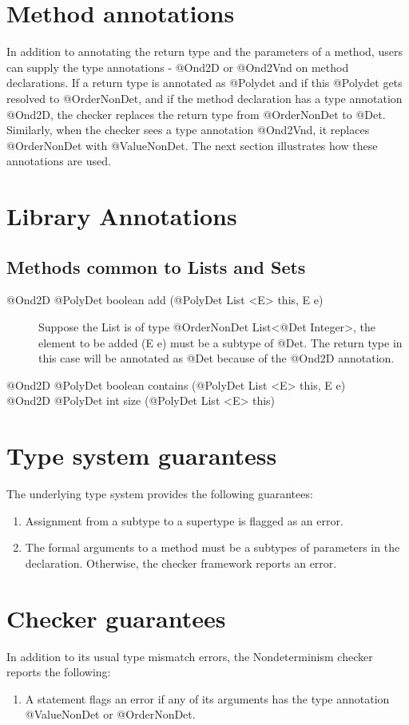 \section{Method annotations\label{nondeterminism-method-annotations}}
In addition to annotating the return type and the parameters of a method, users can supply the type annotations -
@Ond2D or @Ond2Vnd on method declarations.
If a return type is annotated as @Polydet and if this @Polydet gets resolved to @OrderNonDet, and if the method declaration has a type annotation @Ond2D,
the checker replaces the return type from @OrderNonDet to @Det. Similarly, when the checker sees a type annotation @Ond2Vnd, it
replaces @OrderNonDet with @ValueNonDet. The next section illustrates how these annotations are used.

\section{Library Annotations\label{nondeterminism-library-annotations}}
\subsection{Methods common to Lists and Sets\label{lib-methods}}
\begin{description}
  \item[@Ond2D @PolyDet  boolean add (@PolyDet List <E> this, E e)] Suppose the List is of
  type @OrderNonDet List<@Det Integer>, the element to be added (E e) must be a subtype of @Det.
  The return type in this case will be annotated as @Det because of the @Ond2D annotation.
  \item[@Ond2D @PolyDet  boolean contains (@PolyDet List <E> this, E e)]
  \item[@Ond2D @PolyDet int size (@PolyDet List <E> this)]
\end{description}

\section{Type system guarantess\label{nondeterminism-type-system-guarantees}}
The underlying type system provides the following guarantees:
\begin{enumerate}
  \item Assignment from a subtype to a supertype is flagged as an error.
  \item The formal arguments to a method must be a subtypes of parameters in the declaration. Otherwise, the checker framework reports an error.
\end{enumerate}

\section{Checker guarantees\label{nondeterminism-error-reporting}}
In addition to its usual type mismatch errors, the Nondeterminism checker reports the following:
\begin{enumerate}
  \item A  statement flags an error if any of its arguments has the type annotation @ValueNonDet or @OrderNonDet.
\end{enumerate}

